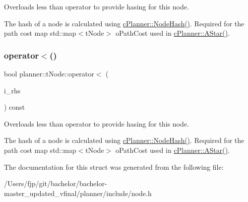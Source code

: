Overloads less than operator to provide hasing for this node. 

The hash of a node is calculated using \mbox{\hyperlink{classplanner_1_1c_planner_a4c99873ce64b214899d65eda6366455f}{c\+Planner\+::\+Node\+Hash()}}. Required for the path cost map std\+::map$<$t\+Node$>$ o\+Path\+Cost used in \mbox{\hyperlink{classplanner_1_1c_planner_a341e70531266f023ac9461d18979d1ef}{c\+Planner\+::\+A\+Star()}}. \mbox{\label{structplanner_1_1t_node_a5085f3fcf4a960ed9fe14068f1b5e950}} 
\subsubsection{\texorpdfstring{operator$<$()}{operator<()}\hspace{0.1cm}{\footnotesize\ttfamily [2/2]}}
{\footnotesize\ttfamily bool planner\+::t\+Node\+::operator$<$ (\begin{DoxyParamCaption}\item[{const \mbox{\hyperlink{structplanner_1_1t_node}{t\+Node}} \&}]{i\+\_\+rhs }\end{DoxyParamCaption}) const\hspace{0.3cm}{\ttfamily [inline]}}



Overloads less than operator to provide hasing for this node. 

The hash of a node is calculated using \mbox{\hyperlink{classplanner_1_1c_planner_a4c99873ce64b214899d65eda6366455f}{c\+Planner\+::\+Node\+Hash()}}. Required for the path cost map std\+::map$<$t\+Node$>$ o\+Path\+Cost used in \mbox{\hyperlink{classplanner_1_1c_planner_a341e70531266f023ac9461d18979d1ef}{c\+Planner\+::\+A\+Star()}}. 

The documentation for this struct was generated from the following file\+:\begin{DoxyCompactItemize}
\item 
/\+Users/fjp/git/bachelor/bachelor-\/master\+\_\+updated\+\_\+vfinal/planner/include/node.\+h\end{DoxyCompactItemize}

